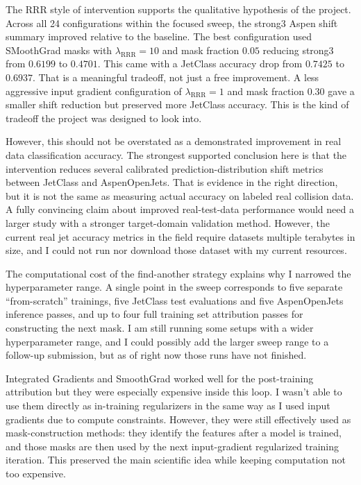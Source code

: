 \documentclass[11pt]{article}
\begin{document}
The RRR style of intervention supports the qualitative hypothesis of the project. Across all 24 configurations within the focused sweep, the strong3 Aspen shift summary improved relative to the baseline. The best configuration used SMoothGrad masks with $\lambda_{\mathrm{RRR}}=10$ and mask fraction $0.05$ reducing strong3 from $0.6199$ to 
$0.4701$. This came with a JetClass accuracy drop from $0.7425$ to $0.6937$. That is a meaningful tradeoff, not just a free improvement. A less aggressive input gradient configuration of $\lambda_{\mathrm{RRR}}=1$ and mask fraction $0.30$ gave a smaller shift reduction but preserved more JetClass accuracy. This is the kind of tradeoff the project was designed to look into.

However, this should not be overstated as a demonstrated improvement in real data classification accuracy. The strongest supported conclusion here is that the intervention reduces several calibrated prediction-distribution shift metrics between JetClass and AspenOpenJets. That is evidence in the right direction, but it is not the same as measuring actual accuracy on labeled real collision data. A fully convincing claim about improved real-test-data performance would need a larger study with a stronger target-domain validation method. However, the current real jet accuracy metrics in the field require datasets multiple terabytes in size, and I could not run nor download those dataset with my current resources.



The computational cost of the find-another strategy explains why I narrowed the hyperparameter range. A single point in the sweep corresponds to five separate “from-scratch” trainings, five JetClass test evaluations and five AspenOpenJets inference passes, and up to four full training set attribution passes for constructing the next mask. I am still running some setups with a wider hyperparameter range, and I could possibly add the larger sweep range to a follow-up submission, but as of right now those runs have not finished. 

Integrated Gradients and SmoothGrad worked well for the post-training attribution but they were especially expensive inside this loop. I wasn’t able to use them directly as in-training regularizers in the same way as I used input gradients due to compute constraints. However, they were still effectively used as mask-construction methods: they identify the features after a model is trained, and those masks are then used by the next input-gradient regularized training iteration. This preserved the main scientific idea while keeping computation not too expensive. 
\end{document}
